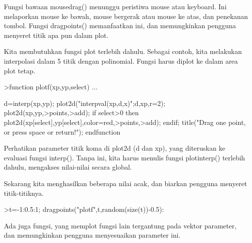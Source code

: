 \documentclass[a4paper,10pt]{article}
\begin{document}
\begin{eulernotebook}
\begin{eulercomment}
\begin{eulercomment}
\begin{eulercomment}
\begin{eulercomment}
\begin{eulercomment}
\begin{eulercomment}
\begin{eulercomment}
\begin{eulercomment}
\begin{eulercomment}
\begin{eulercomment}
\begin{eulercomment}
\begin{eulercomment}
\begin{eulercomment}
\begin{eulercomment}
\begin{eulercomment}
Fungsi bawaan mousedrag() menunggu peristiwa mouse atau keyboard. Ini
melaporkan mouse ke bawah, mouse bergerak atau mouse ke atas, dan
penekanan tombol. Fungsi dragpoints() memanfaatkan ini, dan
memungkinkan pengguna menyeret titik apa pun dalam plot.

Kita membutuhkan fungsi plot terlebih dahulu. Sebagai contoh, kita
melakukan interpolasi dalam 5 titik dengan polinomial. Fungsi harus
diplot ke dalam area plot tetap.
\end{eulercomment}
\begin{eulerprompt}
>function plotf(xp,yp,select) ...
\end{eulerprompt}
\begin{eulerudf}
    d=interp(xp,yp);
    plot2d("interpval(xp,d,x)";d,xp,r=2);
    plot2d(xp,yp,>points,>add);
    if select>0 then
      plot2d(xp[select],yp[select],color=red,>points,>add);
    endif;
    title("Drag one point, or press space or return!");
  endfunction
\end{eulerudf}
\begin{eulercomment}
Perhatikan parameter titik koma di plot2d (d dan xp), yang diteruskan
ke evaluasi fungsi interp(). Tanpa ini, kita harus menulis fungsi
plotinterp() terlebih dahulu, mengakses nilai-nilai secara global.

Sekarang kita menghasilkan beberapa nilai acak, dan biarkan pengguna
menyeret titik-titiknya.
\end{eulercomment}
\begin{eulerprompt}
>t=-1:0.5:1; dragpoints("plotf",t,random(size(t))-0.5):
\end{eulerprompt}
\begin{eulercomment}
Ada juga fungsi, yang memplot fungsi lain tergantung pada vektor
parameter, dan memungkinkan pengguna menyesuaikan parameter ini.


\end{eulercomment}
\end{eulercomment}
\end{eulercomment}
\end{eulercomment}
\end{eulercomment}
\end{eulercomment}
\end{eulercomment}
\end{eulercomment}
\end{eulercomment}
\end{eulercomment}
\end{eulercomment}
\end{eulercomment}
\end{eulercomment}
\end{eulercomment}
\end{eulercomment}
\end{eulernotebook}
\end{document}
